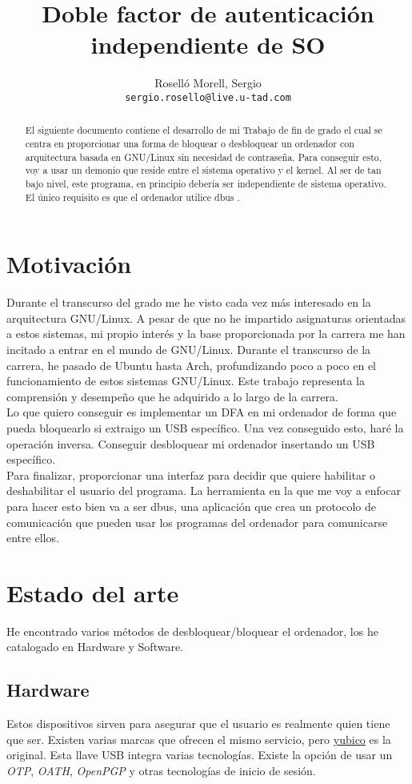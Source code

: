 \documentclass[titlepage]{article}
\title{Doble factor de autenticación independiente de SO}
\author{Roselló Morell, Sergio\\
\texttt{sergio.rosello@live.u-tad.com}}
\begin{document}
\maketitle
\tableofcontents

\begin{abstract}
	El siguiente documento contiene el desarrollo de mi Trabajo de fin de grado el cual se centra en proporcionar una forma de bloquear o desbloquear un ordenador con arquitectura basada en \Gls{GNU}/\Gls{Linux} sin necesidad de contraseña. Para conseguir esto, voy a usar un demonio que reside entre el sistema operativo y el \Gls{kernel}. Al ser de tan bajo nivel, este programa, en principio debería ser independiente de sistema operativo. El único requisito es que el ordenador utilice \Gls{dbus} \cite{dbus}. 
\end{abstract}
\section{Motivación}
Durante el transcurso del grado me he visto cada vez más interesado en la arquitectura \Gls{GNU/Linux}. A pesar de que no he impartido asignaturas orientadas a estos sistemas, mi propio interés y la base proporcionada por la carrera me han incitado a entrar en el mundo de GNU/Linux. Durante el transcurso de la carrera, he pasado de Ubuntu hasta Arch, profundizando poco a poco en el funcionamiento de estos sistemas GNU/Linux. Este trabajo representa la comprensión y desempeño que he adquirido a lo largo de la carrera.\\Lo que quiero conseguir es implementar un \Gls{DFA} en mi ordenador de forma que pueda bloquearlo si extraigo un USB específico. Una vez conseguido esto, haré la operación inversa. Conseguir desbloquear mi ordenador insertando un USB específico.\\Para finalizar, proporcionar una interfaz para decidir que quiere habilitar o deshabilitar el usuario del programa. La herramienta en la que me voy a enfocar para hacer esto bien va a ser dbus, una aplicación que crea un protocolo de comunicación que pueden usar los programas del ordenador para comunicarse entre ellos.
\section{Estado del arte}
He encontrado varios métodos de desbloquear/bloquear el ordenador, los he catalogado en Hardware y Software.
\subsection{Hardware}
Estos dispositivos sirven para asegurar que el usuario es realmente quien tiene que ser. Existen varias marcas que ofrecen el mismo servicio, pero \href{https://www.yubico.com/why-yubico/for-individuals/}{yubico} es la original.
Esta llave USB integra varias tecnologías. Existe la opción de usar un \textit{\Gls{OTP}}, \textit{\Gls{OATH}}, \textit{\Gls{OpenPGP}} y otras tecnologías de inicio de sesión.
\end{document}
